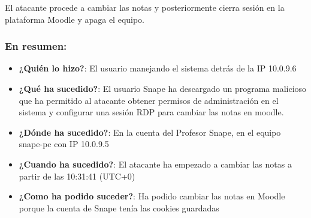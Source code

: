 El atacante procede a cambiar las notas y posteriormente cierra sesión en la plataforma Moodle y apaga el equipo.

\subsubsection{En resumen:}

\begin{itemize}
\item{\textbf{¿Quién lo hizo?}: El usuario manejando el sistema detrás de la IP 10.0.9.6}
\item{\textbf{¿Qué ha sucedido?}: El usuario Snape ha descargado un programa malicioso que ha permitido al atacante obtener permisos de administración en el sistema y configurar una sesión RDP para cambiar las notas en moodle.}
\item{\textbf{¿Dónde ha sucedido?}: En la cuenta del Profesor Snape, en el equipo snape-pc con IP 10.0.9.5}
\item{\textbf{¿Cuando ha sucedido?}: El atacante ha empezado a cambiar las notas a partir de las 10:31:41 (UTC+0)}
\item{\textbf{¿Como ha podido suceder?}: Ha podido cambiar las notas en Moodle porque la cuenta de Snape tenía las cookies guardadas}
\end{itemize}
